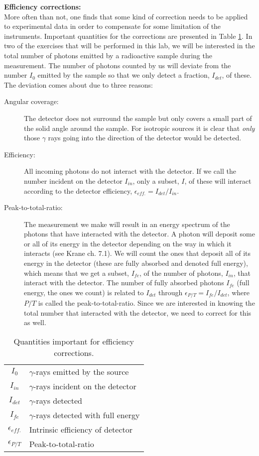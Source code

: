 \documentclass[12pt]{article}
\begin{document}
{\bf\small Efficiency corrections:}\\
More often than not, one finds that some kind of correction needs to
be applied to experimental data in order to compensate for some
limitation of the instruments. Important quantities for the corrections are presented in Table \ref{tab:I}. In two of the exercises that will be
performed in this lab, we will be interested in the total number of
photons emitted by a radioactive sample during the measurement.  The
number of photons counted by us will deviate from the number $I_0$
emitted by the sample so that we only detect a fraction, $I_{det}$, of
these. The deviation comes about due to three reasons:

\begin{description}
\item[Angular coverage:] The detector does not surround the sample but
    only covers a small part of the solid angle around the sample. For
      isotropic sources it is clear that \emph{only} those $\gamma$ rays
        going into the direction of the detector would be detected.
\item[Efficiency:] All incoming photons do not interact with the
  detector. If we call the number incident on the detector $I_{in}$, only a
  subset, $I$, of these will interact according to the detector
  efficiency, $\epsilon_{eff.}=I_{det}/I_{in}$.
\item[Peak-to-total-ratio:] The measurement we make will result in an
  energy spectrum of the photons that have interacted with the
  detector. A photon will deposit some or all of its energy in the
  detector depending on the way in which it interacts (see Krane ch. 7.1). We will count the ones that deposit all of its energy in
  the detector (these are fully absorbed and denoted full energy), which means that we get a subset,
  $I_{fe}$, of the number of photons, $I_{in}$, that interact with the
  detector. The number of fully absorbed photons $I_{fe}$ (full energy, the ones we
  count) is related to $I_{det}$ through $\epsilon_{P/T} = I_{fe}/I_{det}$, where
  $P/T$ is called the peak-to-total-ratio. Since we are interested in
  knowing the total number that interacted with the detector, we need
  to correct for this as well.
\end{description}

\begin{table}[H]
  \centering
  \caption{Quantities important for efficiency corrections.}
\begin{tabular}{c l}
  \hline
  $I_0$ & $\gamma$-rays emitted by the source \\
  $I_{in}$ & $\gamma$-rays incident on the detector \\
  $I_{det}$ & $\gamma$-rays detected \\
  $I_{fe}$ & $\gamma$-rays detected with full energy \\
  \hline
  $\epsilon_{eff.}$ & Intrinsic efficiency of detector \\
  $\epsilon_{P/T}$ & Peak-to-total-ratio \\
\end{tabular}
\label{tab:I}
\end{table}
\end{document}
